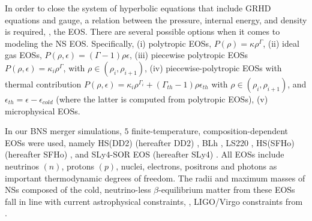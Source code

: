 In order to close the system of hyperbolic equations that include \ac{GRHD} 
equations and gauge, a relation between the pressure, 
internal energy, and density is required, \ie, the \ac{EOS}. 
%
There are several possible options when it comes to modeling the \ac{NS} \ac{EOS}. 
Specifically, 
(i) polytropic \acp{EOS}, $P(\rho)=\kappa\rho^{\Gamma}$, 
(ii) ideal gas \acp{EOS}, $P(\rho,\epsilon)=(\Gamma-1)\rho\epsilon$, 
(iii) piecewise polytropic \acp{EOS} $P(\rho,\epsilon) = \kappa_i\rho^{\Gamma}$, 
with $\rho\in(\rho_i,\rho_{i+1})$, 
(iv) piecewise-polytropic \acp{EOS} with thermal contribution 
$P(\rho,\epsilon)=\kappa_i\rho^{\Gamma_i} + (\Gamma_{th}-1)\rho\epsilon_{th}$ 
with $\rho\in(\rho_i,\rho_{i+1})$, and $\epsilon_{th}=\epsilon-\epsilon_{cold}$ 
(where the latter is computed from polytropic \acp{EOS}), 
(v) microphysical \acp{EOS}.


In our \ac{BNS} merger simulations, $5$ finite-temperature, composition-dependent \acp{EOS} were used, 
namely 
HS(DD2) (hereafter DD2) \citep{Typel:2009sy,Hempel:2009mc}, 
BLh \citep{Bombaci:2018ksa,Logoteta:2020yxf}, 
LS220 \citep{Lattimer:1991nc}, 
HS(SFHo) (hereafter SFHo) \citep{Steiner:2012rk}, and 
SLy4-SOR EOS (hereafter SLy4) \citep{daSilvaSchneider:2017jpg}.
%
All \acp{EOS} include neutrinos $(n)$, protons $(p)$, nuclei, electrons, positrons and photons
as important thermodynamic degrees of freedom.
%
The radii and maximum masses of \acp{NS} composed of the cold, neutrino-less 
$\beta$-equilibrium matter from these \acp{EOS} fall in line with current 
astrophysical constraints, \eg, LIGO/Virgo constraints from \GW{} 
\citep{TheLIGOScientific:2017qsa,Abbott:2018wiz,De:2018uhw,Abbott:2018exr}. 
%


